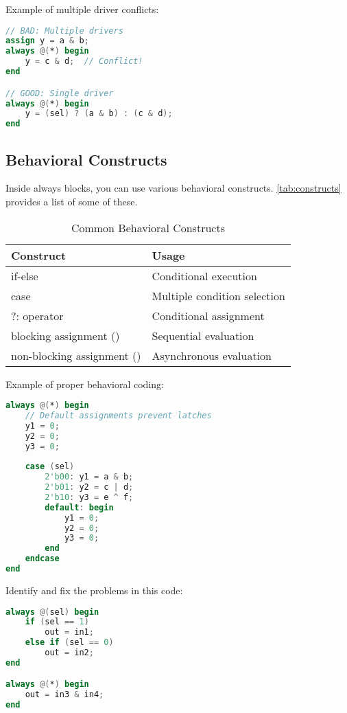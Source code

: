 \documentclass[12pt]{labmanual}
\begin{document}
Example of multiple driver conflicts:
\begin{lstlisting}[language=verilog]
// BAD: Multiple drivers
assign y = a & b;
always @(*) begin
    y = c & d;  // Conflict!
end

// GOOD: Single driver
always @(*) begin
    y = (sel) ? (a & b) : (c & d);
end
\end{lstlisting}

\subsection{Behavioral Constructs}

Inside always blocks, you can use various behavioral constructs. \autoref{tab:constructs} provides a list of some of these. 

\begin{table}[H]
    \centering
    \begin{tabular}{|l|l|}
    \hline
    \textbf{Construct} & \textbf{Usage} \\
    \hline
    if-else & Conditional execution \\
    case & Multiple condition selection \\
    ?: operator & Conditional assignment \\
    blocking assignment (\code{=}) & Sequential evaluation \\
    non-blocking assignment (\code{<=}) & Asynchronous evaluation \\
    \hline
    \end{tabular}
    \caption{Common Behavioral Constructs}
    \label{tab:constructs}
\end{table}

Example of proper behavioral coding:
\begin{lstlisting}[language=verilog]
always @(*) begin
    // Default assignments prevent latches
    y1 = 0;
    y2 = 0;
    y3 = 0;
    
    case (sel)
        2'b00: y1 = a & b;
        2'b01: y2 = c | d;
        2'b10: y3 = e ^ f;
        default: begin
            y1 = 0;
            y2 = 0;
            y3 = 0;
        end
    endcase
end
\end{lstlisting}

\begin{question}
Identify and fix the problems in this code:
\begin{lstlisting}[language=verilog]
always @(sel) begin
    if (sel == 1)
        out = in1;
    else if (sel == 0)
        out = in2;
end

always @(*) begin
    out = in3 & in4;
end
\end{lstlisting}
\end{question}
\end{document}
